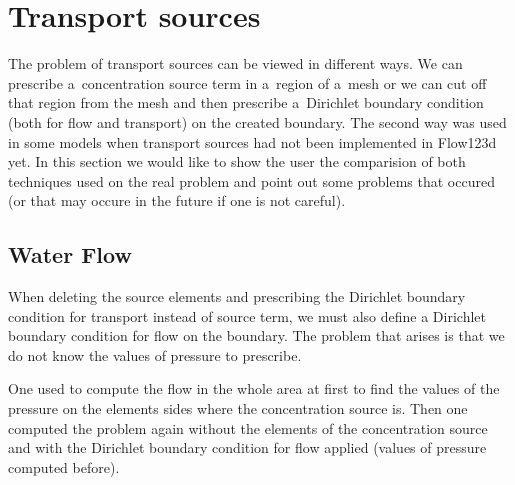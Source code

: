 \pagebreak

\clearpage



\clearpage

\section{Transport sources}
\label{sec:compare_sources}
The problem of transport sources can be viewed in different ways. We can prescribe a~concentration source term in a~region of a~mesh 
or we can cut off that region from the mesh and then prescribe a~Dirichlet boundary condition (both for flow and transport)
on the created boundary. The second way was used in some models when transport sources had not been implemented in Flow123d yet.
In this section we would like to show the user the comparision of both techniques used on the real problem and point out some problems
that occured (or that may occure in the future if one is not careful).

\subsection{Water Flow}
When deleting the source elements and prescribing the Dirichlet boundary condition for transport instead 
of source term, we must also define a Dirichlet boundary condition for flow on the boundary. The problem that arises is that we 
do not know the values of pressure to prescribe. 

One used to compute the flow in the whole area at first to find the values of the pressure on the elements sides 
where the concentration source is. Then one computed the problem again without the elements of the concentration source and with the 
Dirichlet boundary condition for flow applied (values of pressure computed before). 


